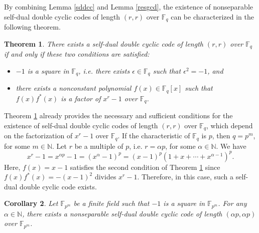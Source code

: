\documentclass[12pt]{article}
\newtheorem{theorem}{Theorem}[section]
\newtheorem{corollary}[theorem]{Corollary}
\begin{document}
	By combining Lemma \ref{sddcc} and Lemma \ref{resgcd}, the existence of nonseparable self-dual double cyclic codes of length $(r,r)$ over $\mathbb{F}_q$ can be characterized in the following theorem.
	\begin{theorem}\label{kareks}
		There exists a self-dual double cyclic code of length $(r,r)$ over $\mathbb{F}_q$ if and only if these two conditions are satisfied:
		\begin{itemize}
			\item $-1$ is a square in $\mathbb{F}_q$, i.e. there exists $\epsilon\in\mathbb{F}_q$ such that $\epsilon^2=-1$, and
			\item there exists a nonconstant polynomial $f(x)\in\mathbb{F}_q[x]$ such that $f(x)f^{*}(x)$ is a factor of $x^r-1$ over $\mathbb{F}_q$.
		\end{itemize}
	\end{theorem}
	Theorem \ref{kareks} already provides the necessary and sufficient conditions for the existence of self-dual double cyclic codes of length $(r,r)$ over $\mathbb{F}_q$, which depend on the factorization of $x^r-1$ over $\mathbb{F}_q$. If the characteristic of $\mathbb{F}_q$ is $p$, then $q=p^m$, for some $m\in\mathbb{N}$.
	Let $r$ be a multiple of $p$, i.e. $r=\alpha p$, for some $\alpha\in\mathbb{N}$. We have $$x^r-1=x^{\alpha p}-1=(x^\alpha-1)^p=(x-1)^p (1+x+\cdots+x^{\alpha-1})^p.$$
	Here, $f(x)=x-1$ satisfies the second condition of Theorem \ref{kareks} since $f(x)f^{*}(x)=-(x-1)^2$ divides $x^r-1$. Therefore, in this case, such a self-dual double cyclic code exists.
	\begin{corollary}\label{teo51}
		Let $\mathbb{F}_{p^m}$ be a finite field such that $-1$ is a square in $\mathbb{F}_{p^m}$. For any $\alpha\in\mathbb{N}$, there exists a nonseparable self-dual double cyclic code of length $(\alpha p,\alpha p)$ over $\mathbb{F}_{p^m}$.
	\end{corollary}
	
\end{document}
